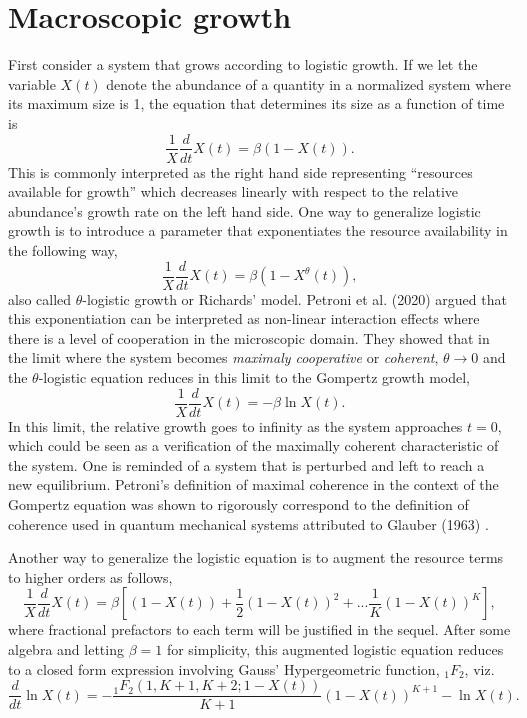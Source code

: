 \documentclass{article}
\begin{document}
\section{Macroscopic growth}
\label{sec:macro}

First consider a system that grows according to logistic growth. If we let the variable $X(t)$ denote the abundance of a quantity in a normalized system where its maximum size is 1, the equation that determines its size as a function of time is
\begin{equation}
  \frac{1}{X}\frac{d}{dt} X(t) = \beta (1 - X(t)).
\end{equation}
This is commonly interpreted as the right hand side representing ``resources available for growth'' which decreases linearly with respect to the relative abundance's growth rate on the left hand side. One way to generalize logistic growth is to introduce a parameter that exponentiates the resource availability in the following way,
\begin{equation}
\label{eq:Rich}
  \frac{1}{X}\frac{d}{dt} X(t) = \beta (1 - X^{\theta}(t)),
\end{equation}
also called $\theta$-logistic growth or Richards' model. Petroni et al. (2020) argued that this exponentiation can be interpreted as non-linear interaction effects where there is a level of cooperation in the microscopic domain. They showed that in the limit where the system becomes \textit{maximaly cooperative} or \textit{coherent}, $\theta\rightarrow 0$ and the $\theta$-logistic equation reduces in this limit to the Gompertz growth model,
 \begin{equation}
 \label{eq:Gomp}
  \frac{1}{X}\frac{d}{dt} X(t) = - \beta \ln X(t).
\end{equation}
In this limit, the relative growth goes to infinity as the system approaches $t=0$, which could be seen as a verification of the maximally coherent characteristic of the system. One is reminded of a system that is perturbed and left to reach a new equilibrium. Petroni's definition of maximal coherence in the context of the Gompertz equation was shown to rigorously correspond to the definition of coherence used in quantum mechanical systems \cite{molski2003coherent} attributed to Glauber (1963) \cite{glauber1963coherent}.

Another way to generalize the logistic equation is to augment the resource terms to higher orders as follows,
\begin{equation}
  \frac{1}{X}\frac{d}{dt} X(t) = \beta \left[(1 - X(t)) + \frac{1}{2}(1 - X(t))^2 + ... \frac{1}{K}(1 - X(t))^K\right],
\end{equation}
where fractional prefactors to each term will be justified in the sequel.
After some algebra and letting $\beta=1$ for simplicity, this augmented logistic equation reduces to a closed form expression involving Gauss' Hypergeometric function, ${}_1F_{2}$, viz.
\begin{equation}
 \label{eq:modLogistic}
\frac{d}{dt}\ln{X(t)} = - \frac{{}_{1}F_{2}({1,K+1,K+2;1-X(t)})}{K+1}(1-X(t))^{K+1} - \ln{X(t)}.
 \end{equation}
\end{document}
